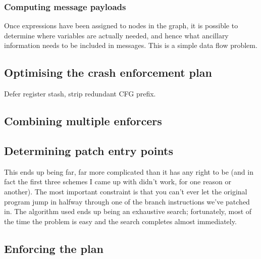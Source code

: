 \subsubsection{Computing message payloads}

Once expressions have been assigned to nodes in the graph, it is possible to determine where variables are actually needed, and hence what ancillary information needs to be included in messages.
This is a simple data flow problem.


\subsection{Optimising the crash enforcement plan}
\label{sect:enforce:optimise_plan}
Defer register stash, strip redundant CFG prefix.

\subsection{Combining multiple enforcers}
\label{sect:enforce:combine_enforcers}

\subsection{Determining patch entry points}
\label{sect:enforce:assign_entry_points}
This ends up being far, far more complicated than it has any right to
be (and in fact the first three schemes I came up with didn't work,
for one reason or another).  The most important constraint is that you
can't ever let the original program jump in halfway through one of the
branch instructions we've patched in.  The algorithm used ends up
being an exhaustive search; fortunately, most of the time the problem
is easy and the search completes almost immediately.

\subsection{Enforcing the plan}


